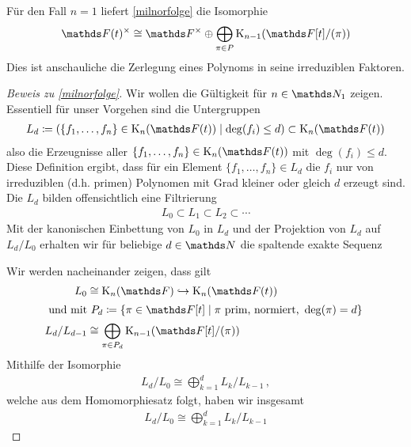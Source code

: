 \documentclass[ngerman,fontsize=11pt, paper=a4, parskip=half, titlepage=true, toc=bib]{scrartcl}
\begin{document}
\begin{Bem}
  Für den Fall $n=1$ liefert \ref{milnorfolge} die Isomorphie
  \begin{gather*}
    \Ft^\times
    \cong \Fx
    \oplus\bigoplus_{\pi\in P}
      \K_{n-1}(\F[t]/(\pi))
    \end{gather*}
    Dies ist anschauliche die Zerlegung eines
    Polynoms in seine irreduziblen Faktoren.
\end{Bem}
\begin{proof}[Beweis zu \ref{milnorfolge}]
  Wir wollen die Gültigkeit für $n\in\N_1$ zeigen.
  Essentiell für unser Vorgehen sind die Untergruppen
  \begin{gather*}
    L_d\coloneqq \left(
      \{f_1,\dotsc,f_n\}\in\KnFt \mid \deg(f_i)\leq d
      \right)
    \subset\KnFt
  \end{gather*}
  also die Erzeugnisse aller $\{f_1,\dotsc,f_n\}\in\KnFt$ mit
  $\deg(f_i)\leq d$. Diese Definition ergibt, dass für ein 
  Element $\{f_1,\dotsc,f_n\}\in L_d$ die $f_i$ nur von 
  irreduziblen (d.h. primen) Polynomen mit
  Grad kleiner oder gleich $d$ erzeugt sind.
  Die $L_d$ bilden offensichtlich eine Filtrierung
  \begin{gather*}
    L_0\subset L_1\subset L_2\subset \dotsb
  \end{gather*}
  Mit der kanonischen Einbettung von $L_0$ in $L_d$ und der Projektion
  von $L_d$ auf $L_d/L_0$ erhalten wir für
  beliebige $d\in\N$ die spaltende exakte Sequenz
  \begin{center}
  \end{center}
  Wir werden nacheinander zeigen, dass gilt
  \begin{align}
    L_0&\cong \KnF\hookrightarrow \KnFt  \label{1}\\
    \intertext{
    und mit $P_d\coloneqq \left\{
    \pi\in \F[t]\mid \pi\text{ prim, normiert, }\deg(\pi)=d
    \right\}$
    }
    L_d/L_{d-1}&\cong \bigoplus_{\pi\in P_d} \K_{n-1}(\F[t]/(\pi))\label{2}
  \end{align}
  Mithilfe der Isomorphie
  \begin{gather} \label{3}
    L_d/L_0\cong \bigoplus_{k=1}^d L_k/L_{k-1} \,,
  \end{gather}
  welche aus dem Homomorphiesatz folgt, haben wir insgesamt
  \begin{align}\label{4}
    L_d/L_0
    \cong \bigoplus_{k=1}^d L_k/L_{k-1}

\end{align}
\end{proof}
\end{document}
